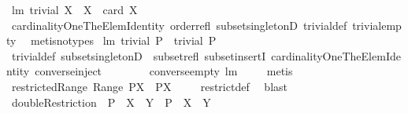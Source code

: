 \begin{isabellebody}
\ lm{}{}{\isacharcolon}\ {\isachardoublequoteopen}trivial\ X\ {\isacharequal}\ {\isacharparenleft}X{\isacharequal}{\isacharbraceleft}{\isacharbraceright}\ {\isasymor}\ card\ X{\isacharequal}{}{\isacharparenright}{\isachardoublequoteclose}\ \isanewline
%
\isadelimproof
\ \ %
\endisadelimproof
%
\isatagproof
{}\isamarkupfalse%
\ cardinalityOneTheElemIdentity\ order{\isacharunderscore}refl\ subset{\isacharunderscore}singletonD\ trivial{\isacharunderscore}def\ trivial{\isacharunderscore}empty\ \isamarkupfalse%
\ {\isacharparenleft}metis{\isacharparenleft}no{\isacharunderscore}types{\isacharparenright}{\isacharparenright}%
\endisatagproof
{\isafoldproof}%
%
\isadelimproof
\isanewline
%
\endisadelimproof
\isanewline
{}\isamarkupfalse%
\ lm{}{}{\isacharcolon}\ {\isachardoublequoteopen}trivial\ P\ {\isacharequal}\ trivial\ {\isacharparenleft}P{\isacharcircum}{\isacharminus}{}{\isacharparenright}{\isachardoublequoteclose}\ \isanewline
%
\isadelimproof
\ \ %
\endisadelimproof
%
\isatagproof
{}\isamarkupfalse%
\ trivial{\isacharunderscore}def\ subset{\isacharunderscore}singletonD\ \ subset{\isacharunderscore}refl\ subset{\isacharunderscore}insertI\ cardinalityOneTheElemIdentity\ converse{\isacharunderscore}inject\isanewline
\ \ \ \ \ \ \ \ converse{\isacharunderscore}empty\ lm{}{}\ \isanewline
\ \ \isamarkupfalse%
\ metis%
\endisatagproof
{\isafoldproof}%
%
\isadelimproof
\isanewline
%
\endisadelimproof
\isanewline
\isanewline
{}\isamarkupfalse%
\ restrictedRange{\isacharcolon}\ {\isachardoublequoteopen}Range\ {\isacharparenleft}P{\isacharbar}{\isacharbar}X{\isacharparenright}\ {\isacharequal}\ P{\isacharbackquote}{\isacharbackquote}X{\isachardoublequoteclose}\ \isanewline
%
\isadelimproof
\ \ %
\endisadelimproof
%
\isatagproof
{}\isamarkupfalse%
\ restrict{\isacharunderscore}def\ \isamarkupfalse%
\ blast%
\endisatagproof
{\isafoldproof}%
%
\isadelimproof
\isanewline
%
\endisadelimproof
\isanewline
{}\isamarkupfalse%
\ doubleRestriction{\isacharcolon}\ \ {\isachardoublequoteopen}{\isacharparenleft}{\isacharparenleft}P\ {\isacharbar}{\isacharbar}\ X{\isacharparenright}\ {\isacharbar}{\isacharbar}\ Y{\isacharparenright}\ {\isacharequal}\ {\isacharparenleft}P\ {\isacharbar}{\isacharbar}\ {\isacharparenleft}X\ {\isasyminter}\ Y{\isacharparenright}{\isacharparenright}{\isachardoublequoteclose}\ \isanewline
%
\isadelimproof
\ \ %
\endisadelimproof

\end{isabellebody}
